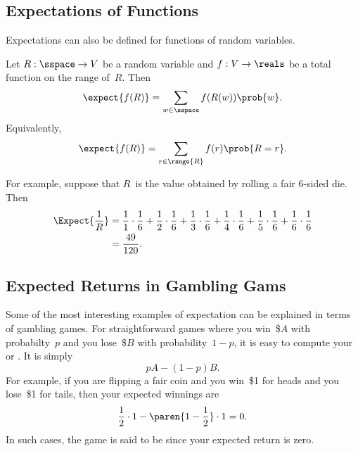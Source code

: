 \subsection{Expectations of Functions}

Expectations can also be defined for functions of random variables.

\begin{definition}\label{def:exp_func}
Let $R: \sspace \to V$ be a random variable and $f: V \to \reals$ be a
total function on the range of~$R$.  Then
\begin{equation}\label{eqn:17P8}
    \expect{f(R)} = \sum_{w \in \sspace} f(R(w)) \prob{w}.
\end{equation}
Equivalently,
\begin{equation}\label{eqn:17P9}
    \expect{f(R)} = \sum_{r \in \range{R}} f(r) \prob{R = r}.
\end{equation}
\end{definition}

For example, suppose that $R$~is the value obtained by rolling a fair
6-sided die.  Then
\begin{align*}
\Expect{\frac{1}{R}}
    &= \frac{1}{1} \cdot \frac{1}{6}
     + \frac{1}{2} \cdot \frac{1}{6}
     + \frac{1}{3} \cdot \frac{1}{6}
     + \frac{1}{4} \cdot \frac{1}{6}
     + \frac{1}{5} \cdot \frac{1}{6}
     + \frac{1}{6} \cdot \frac{1}{6} \\
    &= \frac{49}{120}.
\end{align*}

\subsection{Expected Returns in Gambling Gams}

Some of the most interesting examples of expectation can be explained
in terms of gambling games.  For straightforward games where you
win~\$$A$ with probabilty~$p$ and you lose~\$$B$ with probability~$1 -
p$, it is easy to compute your  or
.  It is simply
\begin{equation*}
    p A - (1 - p) B.
\end{equation*}
For example, if you are flipping a fair coin and you win~\$1 for heads
and you lose~\$1 for tails, then your expected winnings are
\begin{equation*}
    \frac{1}{2} \cdot 1 - \paren{1 - \frac{1}{2}} \cdot 1 = 0.
\end{equation*}
In such cases, the game is said to be  since your expected
return is zero.

